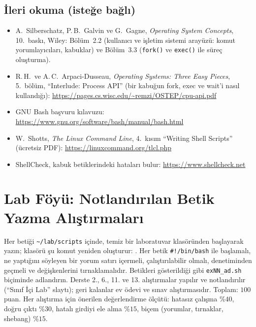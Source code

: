 \subsection*{İleri okuma (isteğe bağlı)}
\begin{itemize}
  \item A.\ Silberschatz, P.\,B.\ Galvin ve G.\ Gagne, \emph{Operating System Concepts}, 10.\ baskı, Wiley: Bölüm~2.2 (kullanıcı ve işletim sistemi arayüzü: komut yorumlayıcıları, kabuklar) ve Bölüm~3.3 (\texttt{fork()} ve \texttt{exec()} ile süreç oluşturma).
  \item R.\,H.\ ve A.\,C.\ Arpaci-Dusseau, \emph{Operating Systems: Three Easy Pieces}, 5.~bölüm, “Interlude: Process API” (bir kabuğun fork, exec ve wait'i nasıl kullandığı): \url{https://pages.cs.wisc.edu/~remzi/OSTEP/cpu-api.pdf}
  \item GNU Bash başvuru kılavuzu: \url{https://www.gnu.org/software/bash/manual/bash.html}
  \item W.\ Shotts, \emph{The Linux Command Line}, 4.~kısım “Writing Shell Scripts” (ücretsiz PDF): \url{https://linuxcommand.org/tlcl.php}
  \item ShellCheck, kabuk betiklerindeki hataları bulur: \url{https://www.shellcheck.net}
\end{itemize}

\section{Lab Föyü: Notlandırılan Betik Yazma Alıştırmaları}

Her betiği \texttt{\textasciitilde/lab/scripts} içinde, temiz bir laboratuvar klasöründen başlayarak yazın; klasörü şu komut yeniden oluşturur: . Her betik \texttt{\#!/bin/bash} ile başlamalı, ne yaptığını söyleyen bir yorum satırı içermeli, çalıştırılabilir olmalı,  denetiminden geçmeli ve değişkenlerini tırnaklamalıdır. Betikleri gösterildiği gibi \texttt{exNN\_ad.sh} biçiminde adlandırın. Derste 2., 6., 11. ve 13. alıştırmalar yapılır ve notlandırılır (“Sınıf İçi Lab” slaytı); geri kalanlar ev ödevi ve sınav alıştırmasıdır. Toplam: $100$ puan. Her alıştırma için önerilen değerlendirme ölçütü: hatasız çalışma \%$40$, doğru çıktı \%$30$, hatalı girdiyi ele alma \%$15$, biçem (yorumlar, tırnaklar, shebang) \%$15$.

